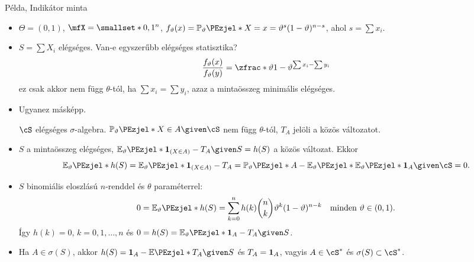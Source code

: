 \documentclass[aspectratio=169,notheorems,9pt,\option]{beamer}
\begin{document}
\begin{frame}{Példa, Indikátor minta}
  \begin{itemize}
    \item $\Theta=(0,1)$, $\mfX=\smallset*{0,1}^n$, 
      $f_\theta(x)=\P[\theta]{X=x}=\theta^{s}(1-\theta)^{n-s}$, ahol $s=\sum x_i$.
    \item $S=\sum X_i$ elégséges. Van-e egyszerűbb elégséges statisztika?
    \pause
    \begin{displaymath}
      \frac{f_\theta(x)}{f_\theta(y)}=\zfrac*{\theta}{1-\theta}^{\sum x_i-\sum y_i}  
    \end{displaymath}
    ez csak akkor nem függ $\theta$-tól, ha $\sum x_i=\sum y_i$, azaz a mintaösszeg minimális elégséges.
    \item Ugyanez másképp. 
    
    $\cS$ elégséges $\sigma$-algebra. $\P[\theta]{X\in A\given \cS}$ nem függ $\theta$-tól, 
    $T_A$ jelöli a közös változatot.
    \item $S$ a mintaösszeg elégséges, $\E[\theta]{\I{X\in A}-T_A\given S}=h(S)$ a közös változat. Ekkor 
    \begin{displaymath}
      \E[\theta]{h(S)}=\E[\theta]{\I{X\in A}-T_A}
      =\P[\theta]{A}-\E[\theta]{\E[\theta]{\I[A]\given \cS}}=0.
    \end{displaymath}
    \item $S$ binomiális eloszlású $n$-renddel 
    és $\theta$ paraméterrel:
    \begin{displaymath}
      0=\E[\theta]{h(S)}=
      \sum_{k=0}^n h(k)\binom n k \theta^k(1-\theta)^{n-k}\quad\text{minden $\theta\in(0,1)$}.
    \end{displaymath}
    Így $h(k)=0$, $k=0,1,\dots,n$ és $0=h(S)=\E[\theta]{\I[A]-T_A\given S}$.
    \item Ha $A\in\sigma(S)$, akkor $h(S)=\I[A]-\E{T_A\given S}$ és $T_A=\I[A]$, vagyis $A\in\cS^*$ és $\sigma(S)\subset\cS^*$.
  \end{itemize}
\end{frame}
\end{document}

